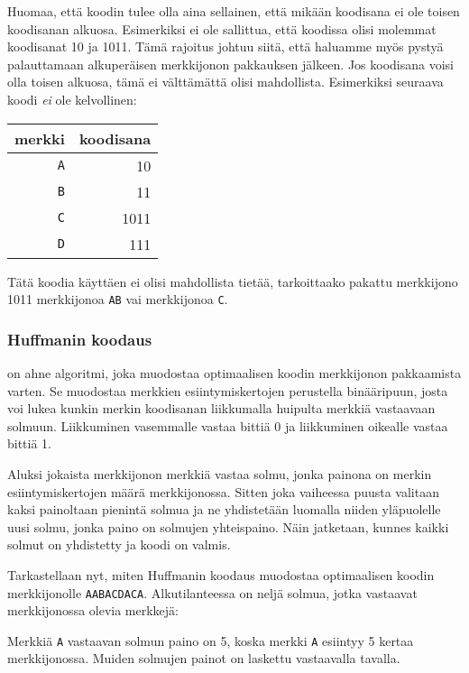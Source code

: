 Huomaa, että koodin tulee olla aina sellainen,
että mikään koodisana ei ole toisen koodisanan
alkuosa.
Esimerkiksi ei ole sallittua, että koodissa
olisi molemmat koodisanat 10 ja 1011.
Tämä rajoitus johtuu siitä,
että haluamme myös pystyä palauttamaan
alkuperäisen merkkijonon pakkauksen jälkeen.
Jos koodisana voisi olla toisen alkuosa,
tämä ei välttämättä olisi mahdollista.
Esimerkiksi seuraava koodi
\emph{ei} ole kelvollinen:
\begin{center}
\begin{tabular}{rr}
merkki & koodisana \\
\hline
\texttt{A} & 10 \\
\texttt{B} & 11 \\
\texttt{C} & 1011 \\
\texttt{D} & 111 \\
\end{tabular}
\end{center}
Tätä koodia käyttäen ei olisi mahdollista tietää,
tarkoittaako pakattu merkkijono 1011
merkkijonoa \texttt{AB} vai merkkijonoa \texttt{C}.


\subsubsection{Huffmanin koodaus}

 on ahne algoritmi,
joka muodostaa optimaalisen koodin
merkkijonon pakkaamista varten.
Se muodostaa merkkien esiintymiskertojen
perustella binääripuun, josta voi lukea
kunkin merkin koodisanan
liikkumalla huipulta merkkiä vastaavaan solmuun.
Liikkuminen vasemmalle vastaa
bittiä 0 ja liikkuminen oikealle
vastaa bittiä 1.

Aluksi jokaista merkkijonon merkkiä vastaa solmu,
jonka painona on merkin esiintymiskertojen määrä merkkijonossa.
Sitten joka vaiheessa puusta valitaan
kaksi painoltaan pienintä solmua
ja ne yhdistetään luomalla niiden
yläpuolelle uusi solmu,
jonka paino on solmujen yhteispaino.
Näin jatketaan, kunnes kaikki solmut
on yhdistetty ja koodi on valmis.

Tarkastellaan nyt, miten Huffmanin koodaus
muodostaa optimaalisen koodin merkkijonolle
\texttt{AABACDACA}.
Alkutilanteessa on neljä solmua,
jotka vastaavat merkkijonossa olevia merkkejä:

\begin{center}
\end{center}
Merkkiä \texttt{A} vastaavan solmun paino on
5, koska merkki \texttt{A} esiintyy 5 kertaa merkkijonossa.
Muiden solmujen painot on laskettu vastaavalla tavalla.

